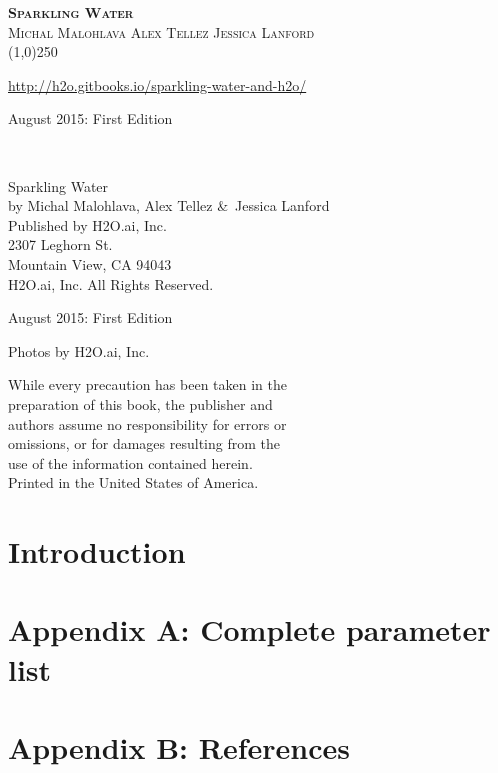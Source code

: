 







\thispagestyle{empty} %

\begin{center}
\textsc{\Large\bf{Sparkling Water}}
\\
\bigskip
\textsc{\small{Michal Malohlava\hspace{40pt} Alex Tellez \hspace{40pt} Jessica Lanford}}
\\
\bigskip
\line(1,0){250}  %


{\url{http://h2o.gitbooks.io/sparkling-water-and-h2o/}}

\bigskip
August 2015: First Edition 
\\%
\bigskip
\end{center}

{\raggedright\vfill\ 

Sparkling Water\\
  by Michal Malohlava, Alex Tellez \&\ Jessica Lanford\\
\bigskip
  Published by H2O.ai, Inc. \\
2307 Leghorn St. \\
Mountain View, CA 94043\\
\bigskip
{} H2O.ai, Inc. All Rights Reserved. 
\bigskip

August 2015: First Edition
\bigskip

Photos by \textcopyright H2O.ai, Inc. 
\bigskip

While every precaution has been taken in the\\
preparation of this book, the publisher and\\
authors assume no responsibility for errors or\\
omissions, or for damages resulting from the\\
use of the information contained herein.\\
\bigskip
Printed in the United States of America. 


}\par

\newpage
\tableofcontents

\newpage

\newpage
\section{Introduction}

\newpage

\section{Appendix A: Complete parameter list}


\newpage
\section{Appendix B: References}

